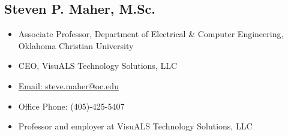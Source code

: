 \documentclass{article}
\begin{document}
\begin{spacing}{.5}
	\subsection{Steven P. Maher, M.Sc.}
		\begin{itemize}[label=--,itemsep=-.35ex]
			\item \large{Associate Professor, Department of Electrical \& Computer Engineering, Oklahoma Christian University}
			\item \large{CEO, VisuALS Technology Solutions, LLC}
			\item \large{\href{mailto::steve.maher@oc.edu}{\large{Email: steve.maher@oc.edu}}}
			\item \large{Office Phone: (405)-425-5407}
			\item \large{Professor and employer at VisuALS Technology Solutions, LLC}
		\end{itemize}

\end{spacing}
\end{document}
